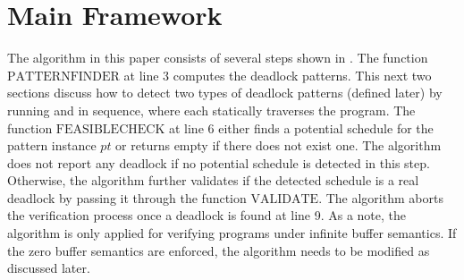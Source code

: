 \section{Main Framework}


\examplefigone

The algorithm in this paper consists of several steps shown in . The function $\mathrm{PATTERNFINDER}$ at line 3 computes the deadlock patterns. This next two sections discuss how to detect two types of deadlock patterns (defined later) by running  and  in sequence, where each statically traverses the program. The function $\mathrm{FEASIBLECHECK}$ at line 6 either finds a potential schedule for the pattern instance $\mathit{pt}$ or returns empty if there does not exist one. The algorithm does not report any deadlock if no potential schedule is detected in this step. Otherwise, the algorithm further validates if the detected schedule is a real deadlock by passing it through the function $\mathrm{VALIDATE}$. The algorithm aborts the verification process once a deadlock is found at line 9. As a note, the algorithm is only applied for verifying programs under infinite buffer semantics. If the zero buffer semantics are enforced, the algorithm needs to be modified as discussed later.

